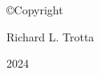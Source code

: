 \chapter[Copyrights]{\label{Copyrights}}

\begin{center}
  \vspace*{\fill}
  {\copyright\hspace{2mm}Copyright\par}
  {Richard L. Trotta\par}
  {2024}
  \vspace*{\fill}
\end{center}  